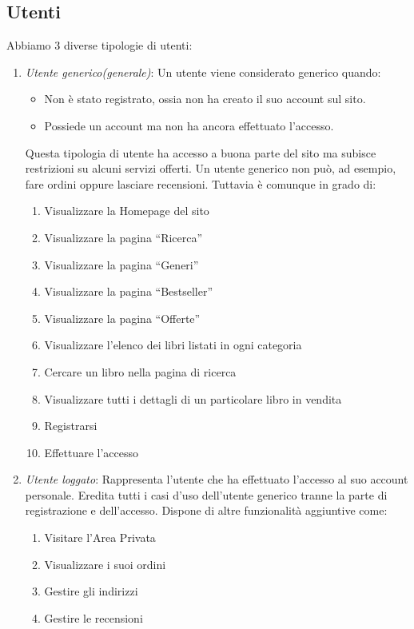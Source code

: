 \subsection{Utenti}
Abbiamo 3 diverse tipologie di utenti:
\begin{enumerate}
	\item \textit{Utente generico(generale)}: Un utente viene considerato generico quando:
		\begin{itemize}
			\item Non è stato registrato, ossia non ha creato il suo account sul sito.
			\item Possiede un account ma non ha ancora effettuato l’accesso.
		\end{itemize}
		Questa tipologia di utente ha accesso a buona parte del sito ma subisce restrizioni su alcuni servizi offerti. Un utente generico non può, ad esempio, fare ordini oppure lasciare recensioni. Tuttavia è comunque in grado di:
			\begin{enumerate}[label*=\arabic*.]
				\item Visualizzare la Homepage del sito
				\item Visualizzare la pagina “Ricerca”
				\item Visualizzare la pagina “Generi”
				\item Visualizzare la pagina “Bestseller”
				\item Visualizzare la pagina “Offerte”
				\item Visualizzare l’elenco dei libri listati in ogni categoria
				\item Cercare un libro nella pagina di ricerca
				\item Visualizzare tutti i dettagli di un particolare libro in vendita 
				\item Registrarsi
				\item Effettuare l’accesso
			\end{enumerate}
	\item \textit{Utente loggato}: Rappresenta l’utente che ha effettuato l’accesso al suo account personale. Eredita tutti i casi d’uso dell’utente generico tranne la parte di registrazione e dell’accesso. Dispone di altre funzionalità aggiuntive come:
			\begin{enumerate}[label*=\arabic*.]
				\item Visitare l'Area Privata 
				\item Visualizzare i suoi ordini
				\item Gestire gli indirizzi
				\item Gestire le recensioni

\end{enumerate}
\end{enumerate}
